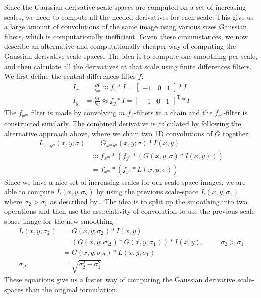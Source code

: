 \documentclass[thesis.tex]{subfiles}
\begin{document}
Since the Gaussian derivative scale-spaces are computed on a set of increasing scales, we need to compute all the needed derivatives for each scale. This give us a large amount of convolutions of the same image using various sizes Gaussian filters, which is computationally inefficient. Given these circumstances, we now describe an alternative and computationally cheaper way of computing the Gaussian derivative scale-spaces. The idea is to compute one smoothing per scale, and then calculate all the derivatives at that scale using finite differences filters. We first define the central differences filter $f$:
%
\begin{align*}
	I_x &= \frac{\partial I}{\partial x} \approx f_x \ast I = \begin{bmatrix} -1 & 0 & 1\end{bmatrix} \ast I \\
	I_y &= \frac{\partial I}{\partial y} \approx f_y \ast I = \begin{bmatrix} -1 & 0 & 1\end{bmatrix}^\text{T} \ast I
\end{align*}
%
The $f_{x^m}$ filter is made by convolving $m$ $f_x$-filters in a chain and the $f_{y^n}$-filter is constructed similarly. The combined derivative is calculated by following the alternative approach above, where we chain two 1D convolutions of $G$ together:
%
\begin{align*}
	L_{x^m y^n}(x,y;\sigma) &= G_{x^m y^n}(x,y;\sigma) \ast I(x,y) \\
		&\approx f_{x^m} \ast \left( f_{y^n} \ast \left (G(x,y;\sigma) \ast I(x,y) \right) \right) \\
		&= f_{x^m} \ast \left( f_{y^n} \ast L(x,y;\sigma) \right)
\end{align*}
%
Since we have a nice set of increasing scales for our scale-space images, we are able to compute $L(x,y,\sigma_2)$ by using the previous scale-space $L(x,y,\sigma_1)$ where $\sigma_2 > \sigma_1$ as described by \citet{tola2008fast}. The idea is to split up the smoothing into two operations and then use the associativity of convolution to use the previous scale-space image for the new smoothing:
%
\begin{align*}
	L(x,y;\sigma_2) &= G(x,y;\sigma_2) \ast I(x,y) \\
					&= (G(x,y;\sigma_\Delta) \ast G(x,y;\sigma_1)) \ast I(x,y),\hspace{1cm}\sigma_2 > \sigma_1 \\
					&= G(x,y;\sigma_\Delta) \ast L(x,y;\sigma_1) \\
			 \sigma_\Delta &= \sqrt{\sigma_2^2 - \sigma_1^2}
\end{align*}
%
These equations give us a faster way of computing the Gaussian derivative scale-spaces than the original formulation.
\end{document}
